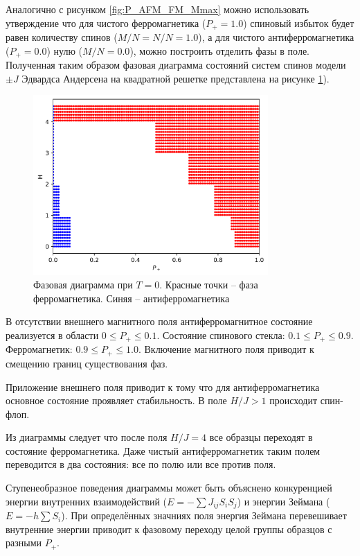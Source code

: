 \documentclass[utf8, babel, sor, jor, amsmath, amssymb, reprint]{elsarticle} %
\begin{document}
Аналогично с рисунком \ref{fig:P_AFM_FM_Mmax} можно использовать утверждение что для чистого ферромагнетика ($P_+ = 1.0$) спиновый избыток будет равен количеству спинов ($M/N = N/N = 1.0$), а для чистого антиферромагнетика ($P_+ = 0.0$) нулю ($M/N = 0.0$), можно построить отделить фазы в поле. Полученная таким образом фазовая диаграмма состояний систем спинов модели $\pm J$ Эдвардса Андерсена на квадратной решетке  представлена на рисунке \ref{fig:P+_afm_fm(H)}).

\begin{figure}[H]
	\centering
	\includegraphics[width=0.8\textwidth]{images/P+_afm_fm(H)_filled.png}
	\caption{Фазовая диаграмма при $T = 0$. Красные точки -- фаза ферромагнетика. Синяя -- антиферромагнетика}
	\label{fig:P+_afm_fm(H)}
\end{figure}

В отсутствии внешнего магнитного поля антиферромагнитное состояние реализуется в области $0 \leq P_+ \leq 0.1$. Состояние спинового стекла: $0.1 \leq P_+ \leq 0.9$. Ферромагнетик: $0.9 \leq P_+ \leq 1.0$. Включение магнитного поля приводит к смещению границ существования фаз.

Приложение внешнего поля приводит к тому что для антиферромагнетика основное состояние проявляет стабильность. В поле $H/J > 1$ происходит спин-флоп.

Из диаграммы следует что после поля $H/J = 4$ все образцы переходят в состояние ферромагнетика. Даже чистый антиферромагнетик таким полем переводится в два состояния: все по полю или все против поля.

Ступенеобразное поведения диаграммы может быть объяснено конкуренцией энергии внутренних взаимодействий ($E = -\sum J_{ij} S_i S_j$) и энергии Зеймана ($E = - h \sum S_i$). При определённых значниях поля энергия Зеймана перевешивает внутренние энергии приводит к фазовому переходу целой группы образцов с разными  $P_+$.
\end{document}
